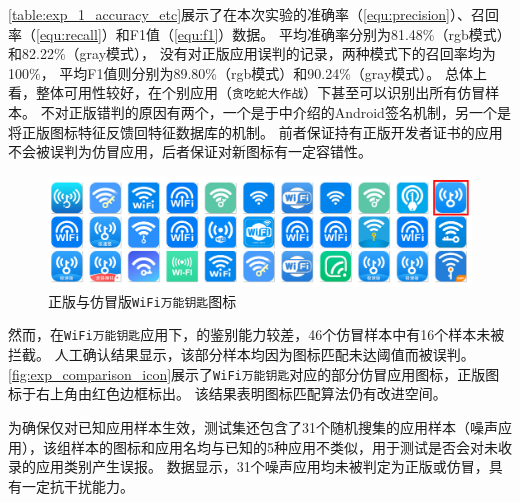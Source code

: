 \autoref{table:exp_1_accuracy_etc}展示了\mytool 在本次实验的准确率（\autoref{equ:precision}）、召回率（\autoref{equ:recall}）和F1值（\autoref{equ:f1}）数据。
\mytool 平均准确率分别为81.48\%（rgb模式）和82.22\%（gray模式），
没有对正版应用误判的记录，两种模式下的召回率均为100\%，
平均F1值则分别为89.80\%（rgb模式）和90.24\%（gray模式）。
总体上看，\mytool 整体可用性较好，在个别应用（\texttt{贪吃蛇大作战}）下甚至可以识别出所有仿冒样本。
\mytool 不对正版错判的原因有两个，一个是于中介绍的Android签名机制，另一个是\componentB 将正版图标特征反馈回特征数据库的机制。
前者保证持有正版开发者证书的应用不会被误判为仿冒应用，后者保证\mytool 对新图标有一定容错性。

\begin{figure}[htbp]
    \centering
    \includegraphics[width=\textwidth]{./Figures/edwin-exp-comparison}
    \caption{正版与仿冒版\texttt{WiFi万能钥匙}图标}
    \label{fig:exp_comparison_icon}
    \vspace{-3mm}
\end{figure}

然而，在\texttt{WiFi万能钥匙}应用下，\mytool 的鉴别能力较差，46个仿冒样本中有16个样本未被拦截。
人工确认结果显示，该部分样本均因为图标匹配未达阈值而被误判。
\autoref{fig:exp_comparison_icon}展示了\texttt{WiFi万能钥匙}对应的部分仿冒应用图标，正版图标于右上角由红色边框标出。
该结果表明图标匹配算法仍有改进空间。

为确保\mytool 仅对已知应用样本生效，测试集还包含了31个随机搜集的应用样本（噪声应用），该组样本的图标和应用名均与已知的5种应用不类似，用于测试\mytool 是否会对未收录的应用类别产生误报。
数据显示，31个噪声应用均未被判定为正版或仿冒，\mytool 具有一定抗干扰能力。


